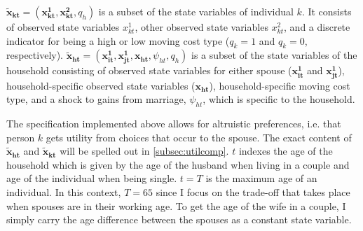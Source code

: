 $\boldsymbol{\tilde{x}_{kt}}=(\boldsymbol{x_{kt}^1},\boldsymbol{x_{kt}^2},q_h)$ is a subset of the state variables of individual $k$. It consists of observed state variables $x_{kt}^1$, other observed state variables $x_{kt}^2$, and a discrete indicator for being a high or low moving cost type ($q_k=1$ and $q_k=0$, respectively). $\boldsymbol{\tilde{x}_{ht}}=(\boldsymbol{x_{it}^1},\boldsymbol{x_{jt}^1},\boldsymbol{x_{ht}},\psi_{ht},q_h)$ is a subset of the state variables of the household consisting of observed state variables for either spouse ($\boldsymbol{x_{it}^1}$ and $\boldsymbol{x_{jt}^1}$), household-specific observed state variables ($\boldsymbol{x_{ht}}$), household-specific moving cost type,  and a shock to gains from marriage, $\psi_{ht}$, which is specific to the household. 

The specification implemented above allows for altruistic preferences, i.e. that person $k$ gets utility from choices that occur to the spouse. The exact content of $\boldsymbol{\tilde{x}_{ht}}$ and $\boldsymbol{\tilde{x}_{kt}}$ will be spelled out in \autoref{subsec:utilcomp}. $t$ indexes the age of the household which is given by the age of the husband when living in a couple and age of the individual when being single. $t=T$ is the maximum age of an individual. In this context, $T=65$ since I focus on the trade-off that takes place when spouses are in their working age. To get the age of the wife in a couple, I simply carry the age difference between the spouses as a constant state variable. 

